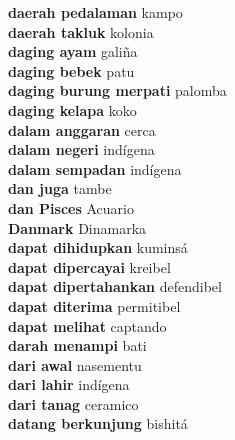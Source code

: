 \textbf{ daerah pedalaman  } kampo \\
\textbf{ daerah takluk  } kolonia \\
\textbf{ daging ayam  } galiña \\
\textbf{ daging bebek  } patu \\
\textbf{ daging burung merpati  } palomba \\
\textbf{ daging kelapa  } koko \\
\textbf{ dalam anggaran  } cerca \\
\textbf{ dalam negeri  } indígena \\
\textbf{ dalam sempadan  } indígena \\
\textbf{ dan juga  } tambe \\
\textbf{ dan Pisces  } Acuario \\
\textbf{ Danmark  } Dinamarka \\
\textbf{ dapat dihidupkan  } kuminsá \\
\textbf{ dapat dipercayai  } kreibel \\
\textbf{ dapat dipertahankan  } defendibel \\
\textbf{ dapat diterima  } permitibel \\
\textbf{ dapat melihat  } captando \\
\textbf{ darah menampi  } bati \\
\textbf{ dari awal  } nasementu \\
\textbf{ dari lahir  } indígena \\
\textbf{ dari tanag  } ceramico \\
\textbf{ datang berkunjung  } bishitá \\
